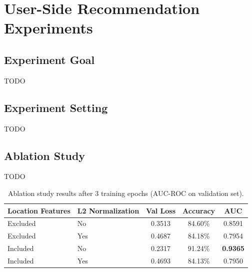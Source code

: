 \section{User-Side Recommendation Experiments}
\label{sec:exp_user}

\subsection{Experiment Goal}
\label{sec:exp_user_goal}

TODO

\subsection{Experiment Setting}
\label{sec:exp_user_setting}

TODO

\subsection{Ablation Study}
\label{sec:exp_user_ablation}

TODO

\begin{table}[htbp]
    \centering
    \caption{Ablation study results after 3 training epochs (AUC-ROC on validation set).}
    \label{tab:ablation_user}
    \begin{tabular}{|l|l|c|c|c|}
        \hline
        \textbf{Location Features} & \textbf{L2 Normalization} & \textbf{Val Loss} & \textbf{Accuracy} & \textbf{AUC} \\
        \hline
        Excluded & No  & 0.3513 & 84.60\% & 0.8591 \\
        Excluded & Yes & 0.4687 & 84.18\% & 0.7954 \\
        Included & No  & 0.2317 & 91.24\% & \textbf{0.9365} \\
        Included & Yes & 0.4693 & 84.13\% & 0.7950 \\
        \hline
    \end{tabular}
\end{table}

